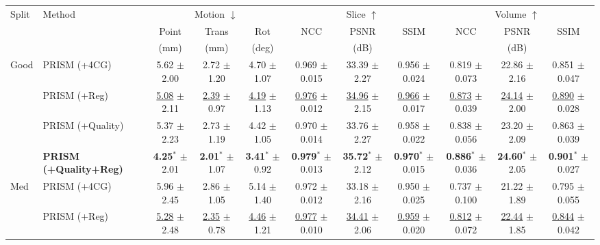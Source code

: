 \begin{tabular}{llccccccccc}
\toprule
Split & Method & \multicolumn{3}{c}{Motion $\downarrow$} & \multicolumn{3}{c}{Slice $\uparrow$} & \multicolumn{3}{c}{Volume $\uparrow$} \\
\cmidrule(lr){3-5}\cmidrule(lr){6-8}\cmidrule(lr){9-11}
 &  & Point & Trans & Rot & NCC & PSNR & SSIM & NCC & PSNR & SSIM \\
 &  & (mm) & (mm) & (deg) &  & (dB) &  &  & (dB) &  \\
\midrule
\multirow{4}{*}{Good} & PRISM (+4CG) & 5.62 {\tiny$\pm$2.00} & 2.72 {\tiny$\pm$1.20} & 4.70 {\tiny$\pm$1.07} & 0.969 {\tiny$\pm$0.015} & 33.39 {\tiny$\pm$2.27} & 0.956 {\tiny$\pm$0.024} & 0.819 {\tiny$\pm$0.073} & 22.86 {\tiny$\pm$2.16} & 0.851 {\tiny$\pm$0.047} \\
 & PRISM (+Reg) & \underline{5.08} {\tiny$\pm$2.11} & \underline{2.39} {\tiny$\pm$0.97} & \underline{4.19} {\tiny$\pm$1.13} & \underline{0.976} {\tiny$\pm$0.012} & \underline{34.96} {\tiny$\pm$2.15} & \underline{0.966} {\tiny$\pm$0.017} & \underline{0.873} {\tiny$\pm$0.039} & \underline{24.14} {\tiny$\pm$2.00} & \underline{0.890} {\tiny$\pm$0.028} \\
 & PRISM (+Quality) & 5.37 {\tiny$\pm$2.23} & 2.73 {\tiny$\pm$1.19} & 4.42 {\tiny$\pm$1.05} & 0.970 {\tiny$\pm$0.014} & 33.76 {\tiny$\pm$2.27} & 0.958 {\tiny$\pm$0.022} & 0.838 {\tiny$\pm$0.056} & 23.20 {\tiny$\pm$2.09} & 0.863 {\tiny$\pm$0.039} \\
 & \textbf{PRISM (+Quality+Reg)} & \textbf{4.25}$^{*}$ {\tiny$\pm$2.01} & \textbf{2.01}$^{*}$ {\tiny$\pm$1.07} & \textbf{3.41}$^{*}$ {\tiny$\pm$0.92} & \textbf{0.979}$^{*}$ {\tiny$\pm$0.013} & \textbf{35.72}$^{*}$ {\tiny$\pm$2.12} & \textbf{0.970}$^{*}$ {\tiny$\pm$0.015} & \textbf{0.886}$^{*}$ {\tiny$\pm$0.036} & \textbf{24.60}$^{*}$ {\tiny$\pm$2.05} & \textbf{0.901}$^{*}$ {\tiny$\pm$0.027} \\
\midrule
\multirow{4}{*}{Med} & PRISM (+4CG) & 5.96 {\tiny$\pm$2.45} & 2.86 {\tiny$\pm$1.05} & 5.14 {\tiny$\pm$1.40} & 0.972 {\tiny$\pm$0.012} & 33.18 {\tiny$\pm$2.16} & 0.950 {\tiny$\pm$0.025} & 0.737 {\tiny$\pm$0.100} & 21.22 {\tiny$\pm$1.89} & 0.795 {\tiny$\pm$0.055} \\
 & PRISM (+Reg) & \underline{5.28} {\tiny$\pm$2.48} & \underline{2.35} {\tiny$\pm$0.78} & \underline{4.46} {\tiny$\pm$1.21} & \underline{0.977} {\tiny$\pm$0.010} & \underline{34.41} {\tiny$\pm$2.06} & \underline{0.959} {\tiny$\pm$0.020} & \underline{0.812} {\tiny$\pm$0.072} & \underline{22.44} {\tiny$\pm$1.85} & \underline{0.844} {\tiny$\pm$0.042} \\

\end{tabular}
